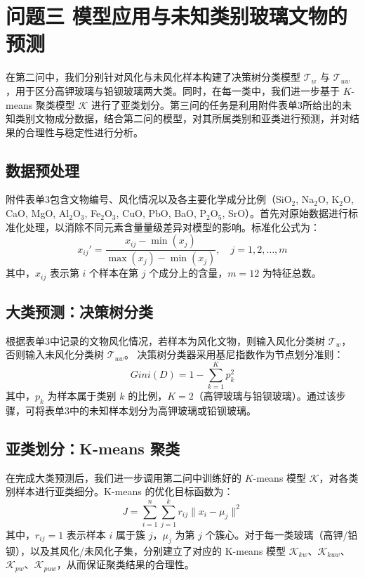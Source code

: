 \documentclass[withoutpreface,bwprint]{cumcmthesis}
\begin{document}
\section{问题三 模型应用与未知类别玻璃文物的预测}
在第二问中，我们分别针对风化与未风化样本构建了决策树分类模型 $\mathcal{T}_{w}$ 与 $\mathcal{T}_{uw}$，用于区分高钾玻璃与铅钡玻璃两大类。同时，在每一类中，我们进一步基于 $K$-means 聚类模型 $\mathcal{K}$ 进行了亚类划分。第三问的任务是利用附件表单3所给出的未知类别文物成分数据，结合第二问的模型，对其所属类别和亚类进行预测，并对结果的合理性与稳定性进行分析。

\subsection{数据预处理}
附件表单3包含文物编号、风化情况以及各主要化学成分比例（SiO$_2$, Na$_2$O, K$_2$O, CaO, MgO, Al$_2$O$_3$, Fe$_2$O$_3$, CuO, PbO, BaO, P$_2$O$_5$, SrO）。首先对原始数据进行标准化处理，以消除不同元素含量量级差异对模型的影响。标准化公式为：
\begin{equation}
x_{ij}' = \frac{x_{ij} - \min(x_j)}{\max(x_j) - \min(x_j)}, 
\quad j = 1,2,\dots,m
\end{equation}
其中，$x_{ij}$ 表示第 $i$ 个样本在第 $j$ 个成分上的含量，$m=12$ 为特征总数。

\subsection{大类预测：决策树分类}
根据表单3中记录的文物风化情况，若样本为风化文物，则输入风化分类树 $\mathcal{T}_w$，否则输入未风化分类树 $\mathcal{T}_{uw}$。  
决策树分类器采用基尼指数作为节点划分准则：
\begin{equation}
Gini(D) = 1 - \sum_{k=1}^{K} p_k^2
\end{equation}
其中，$p_k$ 为样本属于类别 $k$ 的比例，$K=2$（高钾玻璃与铅钡玻璃）。通过该步骤，可将表单3中的未知样本划分为高钾玻璃或铅钡玻璃。

\subsection{亚类划分：K-means 聚类}
在完成大类预测后，我们进一步调用第二问中训练好的 $K$-means 模型 $\mathcal{K}$，对各类别样本进行亚类细分。K-means 的优化目标函数为：
\begin{equation}
J = \sum_{i=1}^{n} \sum_{j=1}^{k} r_{ij} \| x_i - \mu_j \|^2
\end{equation}
其中，$r_{ij}=1$ 表示样本 $i$ 属于簇 $j$，$\mu_j$ 为第 $j$ 个簇心。对于每一类玻璃（高钾/铅钡），以及其风化/未风化子集，分别建立了对应的 K-means 模型 $\mathcal{K}_{kw}$、$\mathcal{K}_{kuw}$、$\mathcal{K}_{pw}$、$\mathcal{K}_{puw}$，从而保证聚类结果的合理性。
\end{document}
